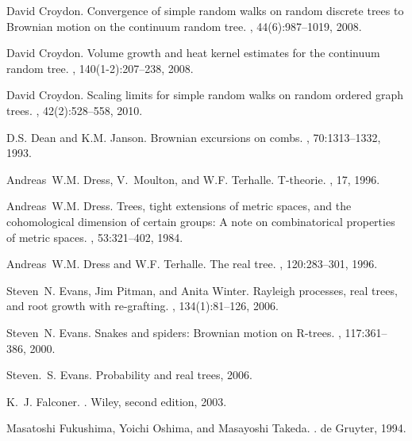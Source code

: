 \documentclass[11pt]{amsart}
\numberwithin{equation}{section}
\begin{document}
{\begin{thebibliography}{DMT96}
David Croydon.
\newblock Convergence of simple random walks on random discrete trees to
  {B}rownian motion on the continuum random tree.
, 44(6):987--1019, 2008.

David Croydon.
\newblock Volume growth and heat kernel estimates for the continuum random
  tree.
, 140(1-2):207--238, 2008.

David Croydon.
\newblock Scaling limits for simple random walks on random ordered graph trees.
, 42(2):528--558, 2010.

D.S. Dean and K.M. Janson.
\newblock Brownian excursions on combs.
, 70:1313--1332, 1993.

Andreas~W.M. Dress, V.~Moulton, and W.F. Terhalle.
\newblock T-theorie.
, 17, 1996.

Andreas~W.M. Dress.
\newblock Trees, tight extensions of metric spaces, and the cohomological
  dimension of certain groups: A note on combinatorical properties of metric
  spaces.
, 53:321--402, 1984.

Andreas~W.M. Dress and W.F. Terhalle.
\newblock The real tree.
, 120:283--301, 1996.

Steven~N. Evans, Jim Pitman, and Anita Winter.
\newblock Rayleigh processes, real trees, and root growth with re-grafting.
, 134(1):81--126, 2006.

Steven~N. Evans.
\newblock Snakes and spiders: Brownian motion on {R}-trees.
, 117:361--386, 2000.

Steven.~S. Evans.
\newblock Probability and real trees, 2006.

K.~J. Falconer.
.
\newblock Wiley, second edition, 2003.

Masatoshi Fukushima, Yoichi Oshima, and Masayoshi Takeda.
.
\newblock de Gruyter, 1994.


\end{thebibliography}}
\end{document}
